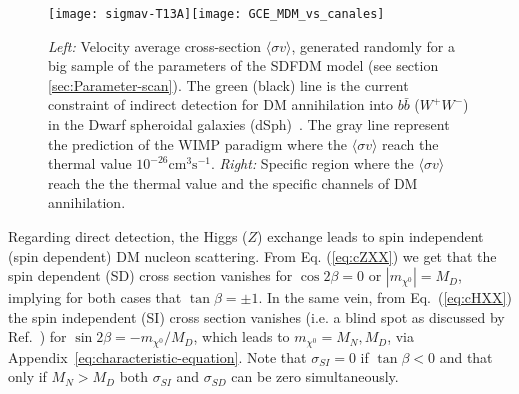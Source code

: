 \begin{figure}[h]
\begin{center}
\texttt{[image: sigmav-T13A]}\texttt{[image: GCE\_MDM\_vs\_canales]}
\end{center}
\caption{\textit{Left:} Velocity average cross-section $\langle\sigma v\rangle$, generated randomly for a big sample of the parameters of the SDFDM model (see section \ref{sec:Parameter-scan}). The green (black) line is the current constraint of indirect detection for DM annihilation into $b\bar{b}$ ($W^+W^-$) in the Dwarf spheroidal galaxies (dSph)~\cite{Ackermann:2015zua}. The gray line represent the prediction of the WIMP paradigm where the $\langle\sigma v\rangle$ reach the thermal value $10^{-26}\text{cm}^{3}\text{s}^{-1}$. \textit{Right:} Specific region where the $\langle\sigma v\rangle$ reach the the thermal value and the specific channels of DM annihilation.}
\label{fig:good-sv}
\end{figure}

Regarding direct detection, the Higgs ($Z$) exchange leads to spin independent  (spin dependent) DM nucleon scattering. From Eq. (\ref{eq:cZXX}) we get that the spin dependent (SD) cross section vanishes for $\cos2\beta=0$ or $|m_{\chi^0}|=M_D$, implying for both cases that $\tan\beta=\pm1$. In the same vein, from Eq.~(\ref{eq:cHXX}) the spin independent (SI) cross section vanishes (i.e. a blind spot as discussed by Ref.~\cite{Cheung:2013dua}) for $\sin2\beta=-m_{\chi^0}/M_D$, which leads to $m_{\chi^0}=M_N, M_D$, via Appendix~\eqref{eq:characteristic-equation}. Note that $\sigma_{SI}=0$ if $\tan\beta<0$ and that only if $M_N>M_D$ both $\sigma_{SI}$ and $\sigma_{SD}$ can be zero simultaneously. 

